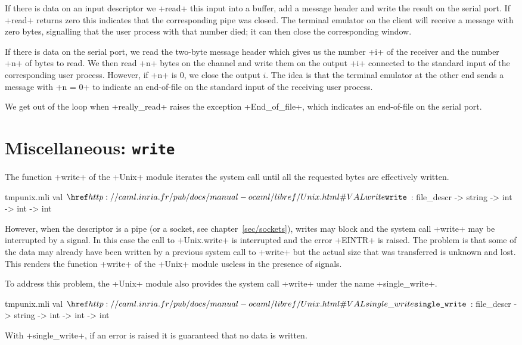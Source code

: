 \begin{example}
If there is data on an input descriptor we \ml+read+ this input into a
buffer, add a message header and write the result on the serial
port. If \ml+read+ returns zero this indicates that the corresponding
pipe was closed. The terminal emulator on the client will receive a
message with zero bytes, signalling that the user process
with that number died; it can then close the corresponding window.

If there is data on the serial port, we read the two-byte message
header which gives us the number \ml+i+ of the receiver and the number
\ml+n+ of bytes to read. We then read \ml+n+ bytes on the channel and
write them on the output \ml+i+ connected to the standard input of the
corresponding user process. However, if \ml+n+ is 0, we close the
output $i$. The idea is that the terminal emulator at the other end
sends a message with \ml+n = 0+ to indicate an end-of-file on the
standard input of the receiving user process.

We get out of the loop when \ml+really_read+ raises the exception
\ml+End_of_file+, which indicates an end-of-file on the
serial port.
\end{example}

\section{Miscellaneous: \texttt{write}}
\label{single_write}

The function \ml+write+ of the \ml+Unix+ module iterates the system call
 until all the requested bytes are effectively written.
\begin{listingcodefile}{tmpunix.mli}
val $\libvalue{Unix}{write}$ : file_descr -> string -> int -> int -> int
\end{listingcodefile}
% 
However, when the descriptor is a pipe (or a socket, see
chapter~\ref{sec/sockets}), writes may block and the system call
\ml+write+ may be interrupted by a signal. In this case the {\ocaml}
call to \ml+Unix.write+ is interrupted and the error \ml+EINTR+ is
raised. The problem is that some of the data may already have been
written by a previous system call to \ml+write+ but the actual size
that was transferred is unknown and lost. This renders the function 
\ml+write+ of the \ml+Unix+ module useless in the presence of signals.
 
To address this problem, the \ml+Unix+ module also provides the
 system call \ml+write+ under the name
\ml+single_write+. 
\begin{listingcodefile}{tmpunix.mli}
val $\libvalue{Unix}{single\_write}$ : file_descr -> string -> int -> int -> int
\end{listingcodefile}
With \ml+single_write+, if an error is raised it is guaranteed that no
data is written.

